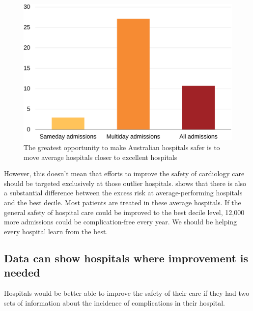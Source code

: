 \documentclass[FrontPage]{grattan}
\begin{document}
\begin{figure}
\caption{The greatest opportunity to make Australian hospitals safer is to move average hospitals closer to excellent hospitals}\label{fig:move-avg-hospitals-closer-to-excellent-ones}
\includegraphics[page=17]{atlas/comps_charts.pdf}
\end{figure}

However, this doesn't mean that efforts to improve the safety of cardiology care should be targeted exclusively at those outlier hospitals.
 shows that there is also a substantial difference between the excess risk at average-performing hospitals and the best decile.
Most patients are treated in these average hospitals.
If the general safety of hospital care could be improved to the best decile level, 12,000 more admissions could be complication-free every year.
We should be helping every hospital learn from the best.

\subsection{Data can show hospitals where improvement is needed}\label{subsec:data-can-show-hospitals-where-improvement-is-needed}

Hospitals would be better able to improve the safety of their care if they had two sets of information about the incidence of complications in their hospital.
\end{document}
